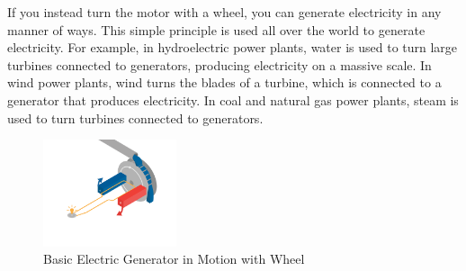 If you instead turn the motor with a wheel, you can generate electricity in any manner of ways. This simple principle is used all
over the world to generate electricity. For example, in hydroelectric power plants, water is used to turn large turbines connected 
to generators, producing electricity on a massive scale. In wind power plants, wind turns the blades of a turbine, which is connected 
to a generator that produces electricity. In coal and natural gas power plants, steam is used to turn turbines connected to generators.

\begin{figure}[htbp]
    \centering
    \includegraphics[width=0.35\textwidth]{basicGeneratorWheel.png}
    \caption{Basic Electric Generator in Motion with Wheel}
    \label{fig:basic-generator-w-wheel}
\end{figure}


